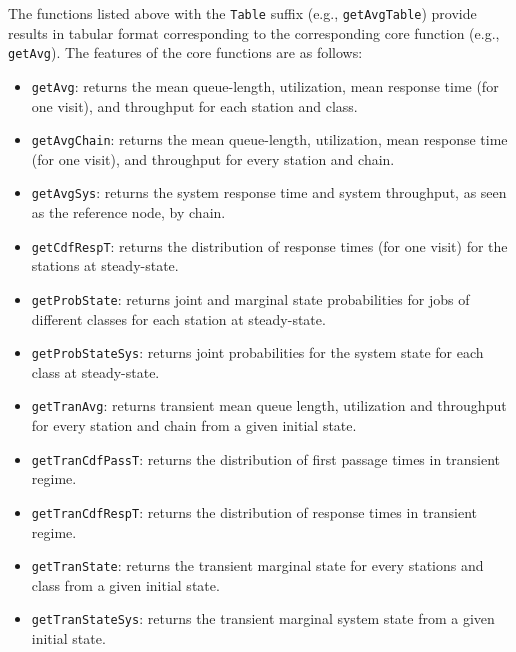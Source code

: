 The functions listed above with the \texttt{Table} suffix (e.g., \texttt{getAvgTable}) provide results in tabular format corresponding to the corresponding core function (e.g., \texttt{getAvg}). The features of the core functions are as follows:
\begin{itemize}
\item \texttt{getAvg}: returns the mean queue-length, utilization, mean response time (for one visit), and throughput for each station and class.
\item \texttt{getAvgChain}: returns the mean queue-length, utilization, mean response time (for one visit), and throughput for every station and chain.
\item \texttt{getAvgSys}: returns the system response time and system throughput, as seen as the reference node, by chain.
\item \texttt{getCdfRespT}: returns the distribution of response times (for one visit) for the stations at steady-state.
\item \texttt{getProbState}: returns joint and marginal state probabilities for jobs of different classes for each station at steady-state.
\item \texttt{getProbStateSys}: returns joint probabilities for the system state for each class at steady-state.
\item \texttt{getTranAvg}: returns transient mean queue length, utilization and throughput for every station and chain from a given initial state.
\item \texttt{getTranCdfPassT}: returns the distribution of first passage times in transient regime.
\item \texttt{getTranCdfRespT}: returns the distribution of response times in transient regime.
\item \texttt{getTranState}: returns the transient marginal state for every stations and class from a given initial state.
\item \texttt{getTranStateSys}: returns the transient marginal system state from a given initial state.
\end{itemize}


